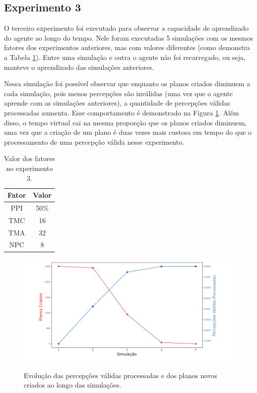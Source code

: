 \subsection{Experimento 3}

O terceiro experimento foi executado para observar a capacidade de aprendizado do agente ao longo do tempo. Nele foram executadas 5 simulações com os mesmos fatores dos experimentos anteriores, mas com valores diferentes (como demonstra a Tabela \ref{table:experiment3factors}). Entre uma simulação e outra o agente não foi recarregado, ou seja, manteve o aprendizado das simulações anteriores.


Nessa simulação foi possível observar que enquanto os planos criados diminuem a cada simulação, pois menos percepções são inválidas (uma vez que o agente aprende com as simulações anteriores), a quantidade de percepções válidas processadas aumenta. Esse comportamento é demonstrado na Figura \ref{fig:perceptions_v_plans-experiment3}. Além disso, o tempo virtual cai na mesma proporção que os planos criados diminuem, uma vez que a criação de um plano é duas vezes mais custosa em tempo do que o processamento de uma percepção válida nesse experimento.


\begin{table}[h!]
    \begin{center}
        \caption{ Valor dos fatores no experimento 3. }
        \label{table:experiment3factors}
        \begin{tabular}{ |c|c| }
            \hline
            \textbf{Fator} & \textbf{Valor}\\
            \hline
            PPI & 50\%\\
            \hline
            TMC & 16\\
            \hline
            TMA & 32\\
            \hline
            NPC & 8\\
            \hline
        \end{tabular}{}
    \end{center}{}
\end{table}

\begin{figure}[h!]
    \centering
    
    \includegraphics[width=\textwidth]{images/perceptions_vs_plans.png}
    \label{fig:perceptions_v_plans-experiment3}
    \caption{Evolução das percepções válidas processadas e dos planos novos criados ao longo das simulações.}
\end{figure}

